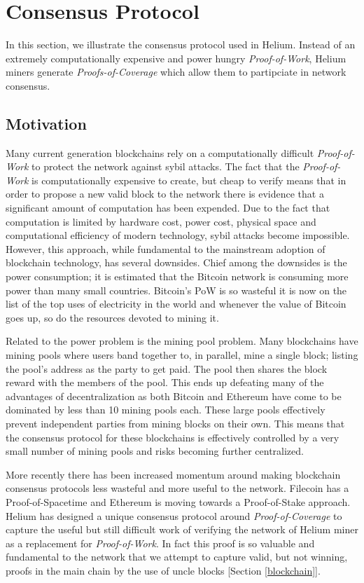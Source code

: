 \documentclass[10pt, nonatbib, nocopyrightspace, reprint]{sigplanconf}
\begin{document}
\section{Consensus Protocol}\label{consensus}

In this section, we illustrate the consensus protocol used in Helium. Instead of an extremely computationally expensive and power hungry \emph{Proof-of-Work}, Helium miners generate \emph{Proofs-of-Coverage} which allow them to partipciate in network consensus.

\subsection{Motivation}

Many current generation blockchains rely on a computationally difficult \emph{Proof-of-Work} to protect the network against sybil attacks. The fact that the \emph{Proof-of-Work} is computationally expensive to create, but cheap to verify means that in order to propose a new valid block to the network there is evidence that a significant amount of computation has been expended. Due to the fact that computation is limited by hardware cost, power cost, physical space and computational efficiency of modern technology, sybil attacks become impossible. However, this approach, while fundamental to the mainstream adoption of blockchain technology, has several downsides. Chief among the downsides is the power consumption; it is estimated that the Bitcoin network is consuming more power than many small countries. Bitcoin's PoW is so wasteful it is now on the list of the top uses of electricity in the world and whenever the value of Bitcoin goes up, so do the resources devoted to mining it.

Related to the power problem is the mining pool problem. Many blockchains have mining pools where users band together to, in parallel, mine a single block; listing the pool's address as the party to get paid. The pool then shares the block reward with the members of the pool. This ends up defeating many of the advantages of decentralization as both Bitcoin and Ethereum have come to be dominated by less than 10 mining pools each. These large pools effectively prevent independent parties from mining blocks on their own. This means that the consensus protocol for these blockchains is effectively controlled by a very small number of mining pools and risks becoming further centralized.

More recently there has been increased momentum around making blockchain consensus protocols less wasteful and more useful to the network. Filecoin \cite{filecoin} has a Proof-of-Spacetime and Ethereum \cite{ethereum} is moving towards a Proof-of-Stake approach. Helium has designed a unique consensus protocol around \emph{Proof-of-Coverage} to capture the useful but still difficult work of verifying the network of Helium miner as a replacement for \emph{Proof-of-Work}. In fact this proof is so valuable and fundamental to the network that we attempt to capture valid, but not winning, proofs in the main chain by the use of uncle blocks [Section \ref{blockchain}].
\end{document}
